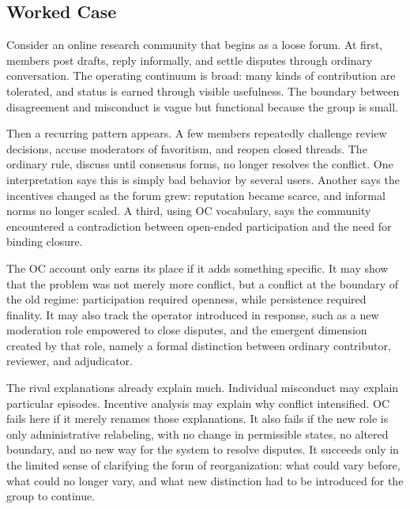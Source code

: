 \documentclass[11pt,a4paper,openany]{book}
\begin{document}
\subsection{Worked Case}
Consider an online research community that begins as a loose forum. At first, members post drafts, reply informally, and settle disputes through ordinary conversation. The operating continuum is broad: many kinds of contribution are tolerated, and status is earned through visible usefulness. The boundary between disagreement and misconduct is vague but functional because the group is small. \cite{wilson_renormalization,landau_stat_physics}\par
Then a recurring pattern appears. A few members repeatedly challenge review decisions, accuse moderators of favoritism, and reopen closed threads. The ordinary rule, discuss until consensus forms, no longer resolves the conflict. One interpretation says this is simply bad behavior by several users. Another says the incentives changed as the forum grew: reputation became scarce, and informal norms no longer scaled. A third, using OC vocabulary, says the community encountered a contradiction between open-ended participation and the need for binding closure.\par
The OC account only earns its place if it adds something specific. It may show that the problem was not merely more conflict, but a conflict at the boundary of the old regime: participation required openness, while persistence required finality. It may also track the operator introduced in response, such as a new moderation role empowered to close disputes, and the emergent dimension created by that role, namely a formal distinction between ordinary contributor, reviewer, and adjudicator.\par
The rival explanations already explain much. Individual misconduct may explain particular episodes. Incentive analysis may explain why conflict intensified. OC fails here if it merely renames those explanations. It also fails if the new role is only administrative relabeling, with no change in permissible states, no altered boundary, and no new way for the system to resolve disputes. It succeeds only in the limited sense of clarifying the form of reorganization: what could vary before, what could no longer vary, and what new distinction had to be introduced for the group to continue.\par
\end{document}

